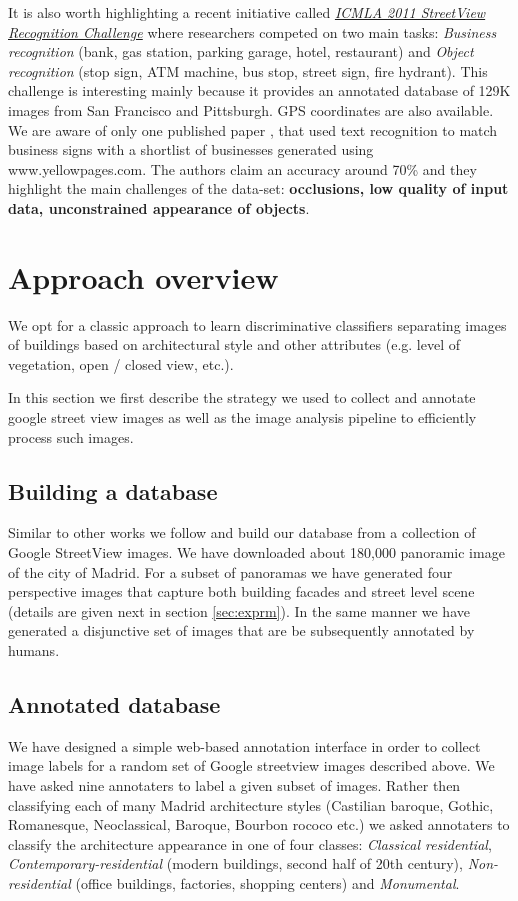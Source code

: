\documentclass[runningheads, table]{llncs}
\begin{document}
It is also worth highlighting a recent initiative called \href{http://www.icmla-conference.org/icmla11/}{\em ICMLA 2011 StreetView Recognition Challenge} where researchers competed on two main tasks: \emph{Business recognition} (bank, gas station, parking garage, hotel, restaurant) and \emph{Object recognition} (stop sign, ATM machine, bus stop, street sign, fire hydrant). 
This challenge is interesting  mainly because it provides an annotated database of 129K images from San Francisco and Pittsburgh. GPS coordinates are also available.  
We are aware of only one published paper \cite{zamir2011street}, that used text recognition to match business signs with a shortlist of businesses generated using www.yellowpages.com. The authors claim an accuracy around 70\% and they highlight the main challenges of the data-set: \textbf{occlusions, low quality of input data, unconstrained appearance of objects}. 

\section{Approach overview}
We opt for a classic approach \cite{csurka04}  to learn discriminative classifiers separating images of buildings based on architectural style and other attributes (e.g. level of vegetation, open / closed view, etc.). 

In this section we first describe the strategy we used to  collect and annotate google street view images as well as the image analysis pipeline to efficiently process such images. 

\subsection{Building a database}
  \vspace{-1mm}
  Similar to other works \cite{Gronat13, Doersch} we follow \cite{Gronat11} and build our database from a collection of Google StreetView images. We have downloaded about 180,000 panoramic image of the city of Madrid. For a subset of panoramas we have generated four perspective images that capture both building facades and street level scene (details are given next in section \ref{sec:exprm}). In the same manner we have generated a disjunctive set of images that are be subsequently annotated by humans. 
  
\subsection{Annotated database} 
  \vspace{-1mm}
  We have designed a simple web-based annotation interface in order to collect image labels for a random set of Google streetview images described above. We have asked nine annotaters to label a given subset of images. Rather then  classifying each of many Madrid architecture styles (Castilian baroque, Gothic, Romanesque, Neoclassical, Baroque, Bourbon rococo etc.) we asked annotaters to classify the architecture appearance in one of four classes: \emph{Classical residential}, \emph{Contemporary-residential} (modern buildings, second half of 20th century), \emph{Non-residential} (office buildings, factories, shopping centers) and \emph{Monumental}. 
\end{document}
